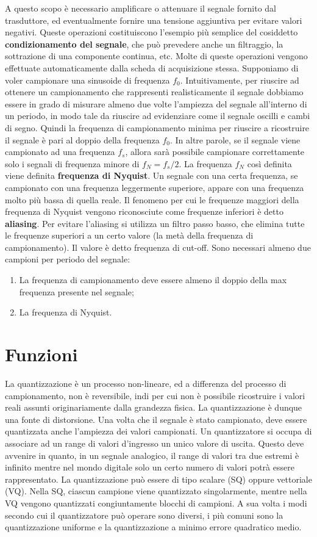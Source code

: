 \documentclass[a4paper,12pt]{article}
\begin{document}
A questo scopo è necessario amplificare o attenuare il segnale fornito dal trasduttore, ed eventualmente fornire una tensione aggiuntiva per evitare valori negativi. Queste operazioni costituiscono l'esempio più semplice del cosiddetto \textbf{condizionamento del segnale}, che può prevedere anche un filtraggio, la sottrazione di una componente continua, etc. Molte di queste operazioni vengono effettuate automaticamente dalla scheda di acquisizione stessa. Supponiamo di voler campionare una sinusoide di frequenza $f_{0}$. Intuitivamente, per riuscire ad ottenere un campionamento che rappresenti realisticamente il segnale dobbiamo essere in grado di misurare almeno due volte l'ampiezza del segnale all'interno di un periodo, in modo tale da riuscire ad evidenziare come il segnale oscilli e cambi di segno. Quindi la frequenza di campionamento minima per riuscire a ricostruire il segnale è pari al doppio della frequenza $f_{0}$. In altre parole, se il segnale viene campionato ad una frequenza $f_{s}$, allora sarà possibile campionare correttamente solo i segnali di frequenza minore di $f_{N}=f_{s}/2$. La frequenza $f_{N}$ così definita viene definita \textbf{frequenza di Nyquist}. Un segnale con una certa frequenza, se campionato con una frequenza leggermente superiore, appare con una frequenza molto più bassa di quella reale. Il fenomeno per cui le frequenze maggiori della frequenza di Nyquist vengono riconosciute come frequenze inferiori è detto \textbf{aliasing}.
Per evitare l'aliasing si utilizza un filtro passo basso, che elimina tutte le frequenze superiori a un certo valore (la metà della frequenza di campionamento). Il valore è detto frequenza di cut-off.
Sono necessari almeno due campioni per periodo del segnale:
\begin{enumerate}
\item La frequenza di campionamento deve essere almeno il doppio della max frequenza presente nel segnale;
\item La frequenza di Nyquist.
\end{enumerate}

\part{Funzioni}
La quantizzazione è un processo non-lineare, ed a differenza del processo di campionamento, non è reversibile, indi per cui non è possibile ricostruire i valori reali assunti originariamente dalla grandezza fisica. La quantizzazione è dunque una fonte di distorsione.
Una volta che il segnale è stato campionato, deve essere quantizzata anche l'ampiezza dei valori campionati. Un quantizzatore si occupa di associare ad un range di valori d'ingresso un unico valore di uscita. Questo deve avvenire in quanto, in un segnale analogico, il range di valori tra due estremi è infinito mentre nel mondo digitale solo un certo numero di valori potrà essere rappresentato. La quantizzazione può essere di tipo scalare (SQ) oppure vettoriale (VQ). Nella SQ, ciascun campione viene quantizzato singolarmente, mentre nella VQ vengono quantizzati congiuntamente blocchi di campioni. A sua volta i modi secondo cui il quantizzatore può operare sono diversi, i più comuni sono la quantizzazione uniforme e la quantizzazione a minimo errore quadratico medio.
\end{document}
